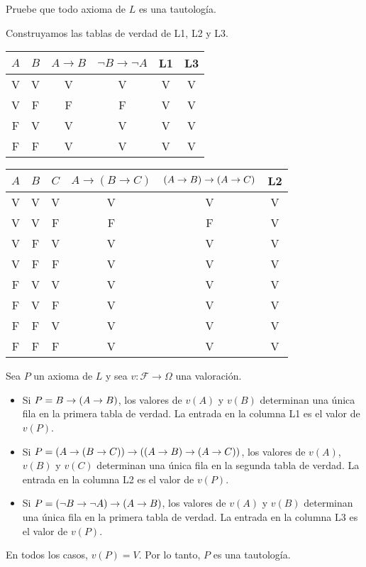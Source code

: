 \begin{exercise}
Pruebe que todo axioma de $L$ es una tautología.
\end{exercise}

\begin{solution}
Construyamos las tablas de verdad de L1, L2 y L3.

\begin{center}
\begin{tabular}{cc|c|c|c|c}
    $A$ & $B$ & $A \to B$ & $\neg B \to \neg A$ & L1 & L3 \\
    \hline
    V & V & V & V & V & V \\
    V & F & F & F & V & V \\
    F & V & V & V & V & V \\
    F & F & V & V & V & V \\
\end{tabular}
\end{center}

\begin{center}
\begin{tabular}{ccc|c|c|c}
    $A$ & $B$ & $C$ & $A \to (B \to C)$ & $(A \to B) \to (A \to C)$ & L2 \\
    \hline
    V & V & V & V & V & V \\
    V & V & F & F & F & V \\
    V & F & V & V & V & V \\
    V & F & F & V & V & V \\
    F & V & V & V & V & V \\
    F & V & F & V & V & V \\
    F & F & V & V & V & V \\
    F & F & F & V & V & V \\
\end{tabular}
\end{center}

Sea $P$ un axioma de $L$ y sea $v : \mathscr F \to \Omega$ una valoración.
\begin{itemize}
    \item Si $P = B \to (A \to B)$, los valores de $v(A)$ y $v(B)$ determinan una única fila en la primera tabla de verdad. La entrada en la columna L1 es el valor de $v(P)$.
    
    \item Si $P = (A \to (B \to C)) \to ((A \to B) \to (A \to C))$, los valores de $v(A)$, $v(B)$ y $v(C)$ determinan una única fila en la segunda tabla de verdad. La entrada en la columna L2 es el valor de $v(P)$.
    
    \item Si $P = (\neg B \to \neg A) \to (A \to B)$, los valores de $v(A)$ y $v(B)$ determinan una única fila en la primera tabla de verdad. La entrada en la columna L3 es el valor de $v(P)$.
\end{itemize}

En todos los casos, $v(P) = V$. Por lo tanto, $P$ es una tautología.
\end{solution}

